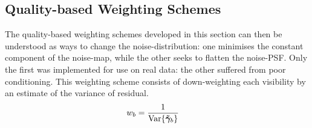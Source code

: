 \subsection{Quality-based Weighting Schemes}\label{sec.qweights.conclusion}

\pg
The quality-based weighting schemes developed in this section can then be understood as ways to change the noise-distribution: one minimises the constant component of the noise-map, while the other seeks to flatten the noise-PSF. Only the first was implemented for use on real data: the other suffered from poor conditioning. This weighting scheme consists of down-weighting each visibility by an estimate of the variance of residual.
\begin{align}
w_{b} &= \frac{1}{\textrm{Var}\{\bm{\tilde{\gamma}}_{b}\}}
\end{align}

